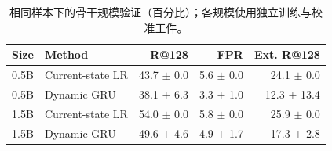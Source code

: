 \begin{table}[t]
\centering\footnotesize
\caption{相同样本下的骨干规模验证（百分比）；各规模使用独立训练与校准工件。}\label{tab:scale}
\begin{tabular}{llrrr}\toprule
Size & Method & R@128 & FPR & Ext. R@128 \\
\midrule
0.5B & Current-state LR & 43.7 $\pm$ 0.0 & 5.6 $\pm$ 0.0 & 24.1 $\pm$ 0.0 \\
0.5B & Dynamic GRU & 38.1 $\pm$ 6.3 & 3.3 $\pm$ 1.0 & 12.3 $\pm$ 13.4 \\
1.5B & Current-state LR & 54.0 $\pm$ 0.0 & 5.8 $\pm$ 0.0 & 25.9 $\pm$ 0.0 \\
1.5B & Dynamic GRU & 49.6 $\pm$ 4.6 & 4.9 $\pm$ 1.7 & 17.3 $\pm$ 2.8 \\
\bottomrule\end{tabular}
\end{table}
